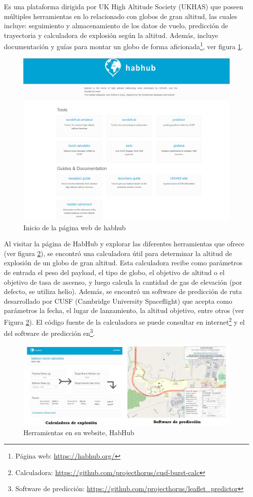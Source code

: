 Es una plataforma dirigida por UK High Altitude Society (UKHAS)  que poseen múltiples herramientas en lo relacionado con globos de gran altitud, las cuales incluye: seguimiento y almacenamiento de los datos de vuelo, predicción de trayectoria y calculadora de explosión según la altitud. Además, incluye documentación y guías para montar un globo de forma aficionada\footnote{Página web:  \url{https://habhub.org/}}, ver figura \ref{fig:habhub}. 

\newpage

\begin{figure}[!ht]
    \centering
    \includegraphics[width=0.5\linewidth]{document/figures/01_habhub_inicio.png}
    \caption{Inicio de la página web de habhub}
    \label{fig:habhub}
\end{figure}

Al visitar la página de HabHub y explorar las diferentes herramientas que ofrece (ver figura \ref{fig:cal_predic_habhub}), se encontró una calculadora útil para determinar la altitud de explosión de un globo de gran altitud. Esta calculadora recibe como parámetros de entrada el peso del payload, el tipo de globo, el objetivo de altitud o el objetivo de tasa de ascenso, y luego calcula la cantidad de gas de elevación (por defecto, se utiliza helio). Además, se encontró un software de predicción de ruta desarrollado por CUSF (Cambridge University Spaceflight) que acepta como parámetros la fecha, el lugar de lanzamiento, la altitud objetivo, entre otros (ver Figura \ref{fig:cal_predic_habhub}). El código fuente de la calculadora se puede consultar en internet\footnote{Calculadora: \url{https://github.com/projecthorus/cusf-burst-calc}} y el del software de predicción en\footnote{Software de predicción: \url{https://github.com/projecthorus/leaflet_predictor}}.

\begin{figure}[!ht]
    \centering
    \includegraphics[width=0.95\linewidth]{document/figures/01_predic_calcBurst_habhub.jpg}
    \caption{Herramientas en su website, HabHub}
    \label{fig:cal_predic_habhub}
\end{figure}


